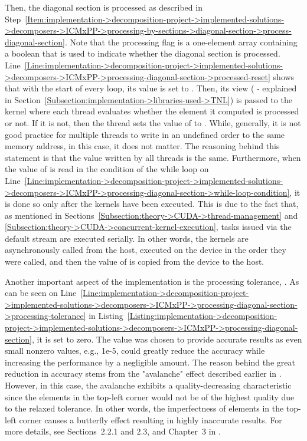 Then, the diagonal section is processed as described in Step~\ref{Item:implementation->decomposition-project->implemented-solutions->decomposers->ICMxPP->processing-by-sections->diagonal-section->process-diagonal-section}.
Note that the processing flag  is a one-element array containing a boolean that is used to indicate whether the diagonal section is processed.
Line~\ref{Line:implementation->decomposition-project->implemented-solutions->decomposers->ICMxPP->processing-diagonal-section->processed-reset} shows that with the start of every loop, its value is set to .
Then, its view ( - explained in Section~\ref{Subsection:implementation->libraries-used->TNL}) is passed to the kernel where each thread evaluates whether the element it computed is processed or not.
If it is not, then the thread sets the value of  to .
While, generally, it is not good practice for multiple threads to write in an undefined order to the same memory address, in this case, it does not matter.
The reasoning behind this statement is that the value written by all threads is the same.
Furthermore, when the value of  is read in the condition of the while loop on Line~\ref{Line:implementation->decomposition-project->implemented-solutions->decomposers->ICMxPP->processing-diagonal-section->while-loop-condition}, it is done so only after the kernels have been executed.
This is due to the fact that, as mentioned in Sections~\ref{Subsection:theory->CUDA->thread-management} and \ref{Subsection:theory->CUDA->concurrent-kernel-execution}, tasks issued via the default stream are executed serially.
In other words, the kernels are asynchronously called from the host, executed on the device in the order they were called, and then the value of  is copied from the device to the host.

Another important aspect of the implementation is the processing tolerance, .
As can be seen on Line~\ref{Line:implementation->decomposition-project->implemented-solutions->decomposers->ICMxPP->processing-diagonal-section->processing-tolerance} in Listing~\ref{Listing:implementation->decomposition-project->implemented-solutions->decomposers->ICMxPP->processing-diagonal-section}, it is set to zero.
The value was chosen to provide accurate results as even small nonzero values, e.g., 1e-5, could greatly reduce the accuracy while increasing the performance by a negligible amount.
The reason behind the great reduction in accuracy stems from the "avalanche" effect described earlier in .
However, in this case, the avalanche exhibits a quality-decreasing characteristic since the elements in the top-left corner would not be of the highest quality due to the relaxed tolerance.
In other words, the imperfectness of elements in the top-left corner causes a butterfly effect resulting in highly inaccurate results.
For more details, see Sections~2.2.1 and 2.3, and Chapter~3 in  \cite{Cejka2022}.

